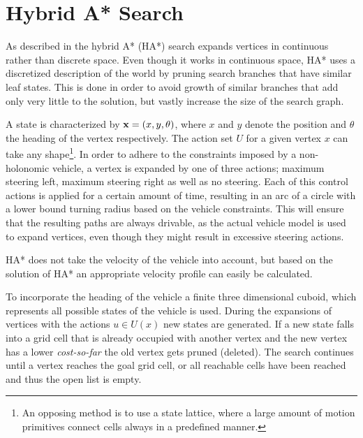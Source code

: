 \section{Hybrid A* Search}
As described in  the hybrid A* (HA*) search expands vertices in continuous rather than discrete space. Even though it works in continuous space, HA* uses a discretized description of the world by pruning search branches that have similar leaf states. This is done in order to avoid growth of similar branches that add only very little to the solution, but vastly increase the size of the search graph.

A state is characterized by $\mathbf{x} = (x, y, \theta)$, where $x$ and $y$ denote the position and $\theta$ the heading of the vertex respectively. The action set $U$ for a given vertex $x$ can take any shape\footnote{An opposing method is to use a state lattice, where a large amount of motion primitives connect cells always in a predefined manner.}. In order to adhere to the constraints imposed by a non-holonomic vehicle, a vertex is expanded by one of three actions; maximum steering left, maximum steering right as well as no steering. Each of this control actions is applied for a certain amount of time, resulting in an arc of a circle with a lower bound turning radius based on the vehicle constraints. This will ensure that the resulting paths are always drivable, as the actual vehicle model is used to expand vertices, even though they might result in excessive steering actions.

HA* does not take the velocity of the vehicle into account, but based on the solution of HA* an appropriate velocity profile can easily be calculated.

To incorporate the heading of the vehicle a finite three dimensional cuboid, which represents all possible states of the vehicle is used. During the expansions of vertices with the actions $u \in U(x)$ new states are generated. If a new state falls into a grid cell that is already occupied with another vertex and the new vertex has a lower \textit{cost-so-far} the old vertex gets pruned (deleted). The search continues until a vertex reaches the goal grid cell, or all reachable cells have been reached and thus the open list is empty.

